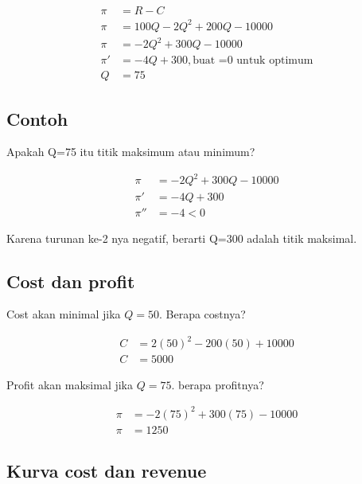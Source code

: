 \documentclass[
  letterpaper,
  DIV=11,
  numbers=noendperiod]{scrartcl}
\begin{document}
\[
\begin{align}
\pi&=R-C \\
\pi&=100Q-2Q^2+200Q-10000 \\
\pi&=-2Q^2+300Q-10000 \\
\pi'&=-4Q+300,\text{buat =0 untuk optimum} \\
Q&=75
\end{align}
\]

\hypertarget{contoh-11}{%
\subsection{Contoh}\label{contoh-11}}

Apakah Q=75 itu titik maksimum atau minimum?

\[
\begin{align}
\pi&=-2Q^2+300Q-10000 \\
\pi'&=-4Q+300 \\
\pi''&=-4<0
\end{align}
\]

Karena turunan ke-2 nya negatif, berarti Q=300 adalah titik maksimal.

\hypertarget{cost-dan-profit}{%
\subsection{Cost dan profit}\label{cost-dan-profit}}

Cost akan minimal jika \(Q=50\). Berapa costnya?

\[
\begin{align}
C&=2(50)^2-200(50)+10000 \\
C&=5000
\end{align}
\]

Profit akan maksimal jika \(Q=75\). berapa profitnya?

\[
\begin{align}
\pi&=-2(75)^2+300(75)-10000 \\
\pi&=1250
\end{align}
\]

\hypertarget{kurva-cost-dan-revenue}{%
\subsection{Kurva cost dan revenue}\label{kurva-cost-dan-revenue}}
\end{document}
